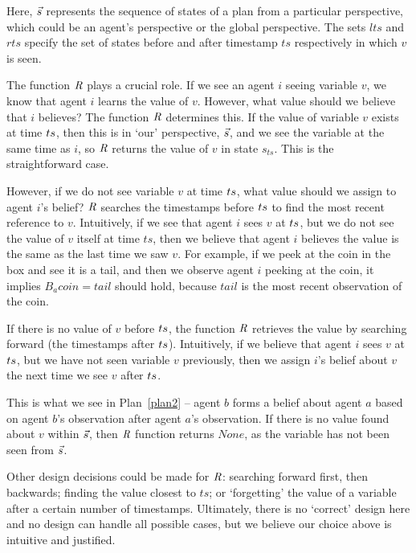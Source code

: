 Here, $\Vec{s}$ represents the sequence of states of a plan from a particular perspective, which could be an agent's perspective or the global perspective. The sets $lts$ and $rts$ specify the set of states before and after timestamp $ts$ respectively in which $v$ is seen.

The function $\mathit{R}$ plays a crucial role. If we see an agent $i$ seeing variable $v$, we know that agent $i$ learns the value of $v$. However, what value should we believe that $i$ believes? The function $\mathit{R}$ determines this.
%
If the value of variable $v$ exists at time $ts$, then this is in `our' perspective, $\Vec{s}$, and we see the variable at the same time as $i$, so $\mathit{R}$ returns the value of $v$ in state $s_{ts}$. This is the straightforward case. 

However, if we do not see variable $v$ at time $ts$, what value should we assign to agent $i$'s belief?  $\mathit{R}$ searches the timestamps before $ts$ to find the most recent reference to $v$. Intuitively, if we see that agent $i$ sees $v$ at $ts$, but we do not see the value of $v$ itself at time $ts$, then we believe that agent $i$ believes the value is the same as the last time we saw $v$. For example, if we peek at the coin in the box and see it is a tail, and then we observe agent $i$ peeking at the coin, it implies $B_a coin=tail$ should hold, because $tail$ is the most recent observation of the coin.

If there is no value of $v$  before $ts$, the function $\mathit{R}$ retrieves the value by searching forward (the timestamps after $ts$).
Intuitively, if we believe that agent $i$ sees $v$ at $ts$, but we have not seen variable $v$ previously, then we assign $i$'s belief about $v$ the next time we see $v$ after $ts$.

%
This is what we see in Plan~\ref{plan2} -- agent $b$ forms a belief about agent $a$ based on agent $b$'s observation after agent $a$'s observation.
If there is no value found about $v$ within $\Vec{s}$, then $\mathit{R}$ function returns $None$, as the variable has not been seen from $\Vec{s}$. 


Other design decisions could be made for $\mathit{R}$: searching forward first, then backwards; finding the value closest to $ts$; or `forgetting' the value of a variable after a certain number of timestamps. Ultimately, there is no `correct' design here and no design can handle all possible cases, but we believe our choice above is intuitive and justified.

